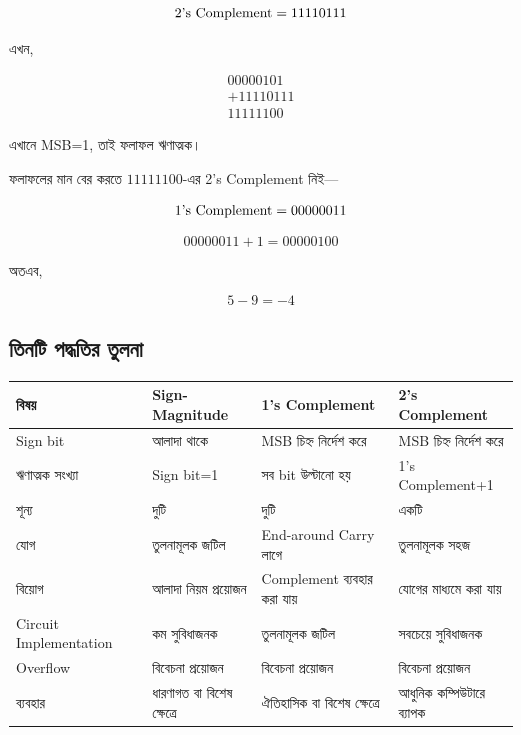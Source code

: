 \[
\text{\textenglish{2's Complement}}=11110111
\]

এখন,

\[
\begin{array}{r}
00000101\\
+11110111\\
\hline
11111100
\end{array}
\]

এখানে \textenglish{MSB}=1, তাই ফলাফল ঋণাত্মক।

ফলাফলের মান বের করতে $11111100$-এর
\textenglish{2's Complement} নিই—

\[
\text{\textenglish{1's Complement}}=00000011
\]

\[
00000011+1=00000100
\]

অতএব,

\[
\boxed{5-9=-4}
\]


\subsection{তিনটি পদ্ধতির তুলনা}

\begin{center}
\begin{tabularx}{\textwidth}{|L{0.18\textwidth}|Y|Y|Y|}
\hline
{}
\textbf{বিষয়} &
\textbf{\textenglish{Sign-Magnitude}} &
\textbf{\textenglish{1's Complement}} &
\textbf{\textenglish{2's Complement}} \\
\hline

\textenglish{Sign bit} &
আলাদা থাকে &
\textenglish{MSB} চিহ্ন নির্দেশ করে &
\textenglish{MSB} চিহ্ন নির্দেশ করে \\
\hline

ঋণাত্মক সংখ্যা &
\textenglish{Sign bit}=1 &
সব \textenglish{bit} উল্টানো হয় &
\textenglish{1's Complement}+1 \\
\hline

শূন্য &
দুটি &
দুটি &
একটি \\
\hline

যোগ &
তুলনামূলক জটিল &
\textenglish{End-around Carry} লাগে &
তুলনামূলক সহজ \\
\hline

বিয়োগ &
আলাদা নিয়ম প্রয়োজন &
\textenglish{Complement} ব্যবহার করা যায় &
যোগের মাধ্যমে করা যায় \\
\hline

\textenglish{Circuit Implementation} &
কম সুবিধাজনক &
তুলনামূলক জটিল &
সবচেয়ে সুবিধাজনক \\
\hline

\textenglish{Overflow} &
বিবেচনা প্রয়োজন &
বিবেচনা প্রয়োজন &
বিবেচনা প্রয়োজন \\
\hline

ব্যবহার &
ধারণাগত বা বিশেষ ক্ষেত্রে &
ঐতিহাসিক বা বিশেষ ক্ষেত্রে &
আধুনিক কম্পিউটারে ব্যাপক \\
\hline
\end{tabularx}
\end{center}

